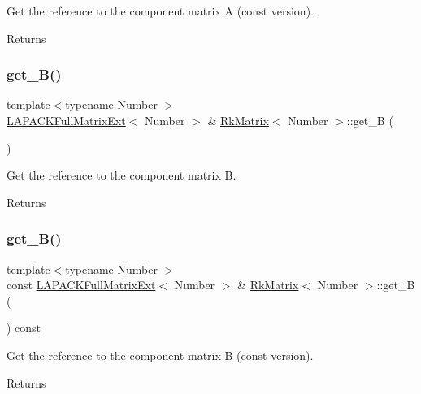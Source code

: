 Get the reference to the component matrix {\ttfamily A} (const version). \begin{DoxyReturn}{Returns}

\end{DoxyReturn}
\mbox{\label{classRkMatrix_aca855d29d0dd3036ba75d0e3ca75d88e}} 
\subsubsection{\texorpdfstring{get\+\_\+\+B()}{get\_B()}\hspace{0.1cm}{\footnotesize\ttfamily [1/2]}}
{\footnotesize\ttfamily template$<$typename Number $>$ \\
\hyperlink{classLAPACKFullMatrixExt}{L\+A\+P\+A\+C\+K\+Full\+Matrix\+Ext}$<$ Number $>$ \& \hyperlink{classRkMatrix}{Rk\+Matrix}$<$ Number $>$\+::get\+\_\+B (\begin{DoxyParamCaption}{ }\end{DoxyParamCaption})}

Get the reference to the component matrix {\ttfamily B}. \begin{DoxyReturn}{Returns}

\end{DoxyReturn}
\mbox{\label{classRkMatrix_a69695b04d890d753bd3343e4665ca0ba}} 
\subsubsection{\texorpdfstring{get\+\_\+\+B()}{get\_B()}\hspace{0.1cm}{\footnotesize\ttfamily [2/2]}}
{\footnotesize\ttfamily template$<$typename Number $>$ \\
const \hyperlink{classLAPACKFullMatrixExt}{L\+A\+P\+A\+C\+K\+Full\+Matrix\+Ext}$<$ Number $>$ \& \hyperlink{classRkMatrix}{Rk\+Matrix}$<$ Number $>$\+::get\+\_\+B (\begin{DoxyParamCaption}{ }\end{DoxyParamCaption}) const}

Get the reference to the component matrix {\ttfamily B} (const version). \begin{DoxyReturn}{Returns}

\end{DoxyReturn}
\mbox{\label{classRkMatrix_ae69122e3ee1c49a4fbe48cf3d7a20581}} 
